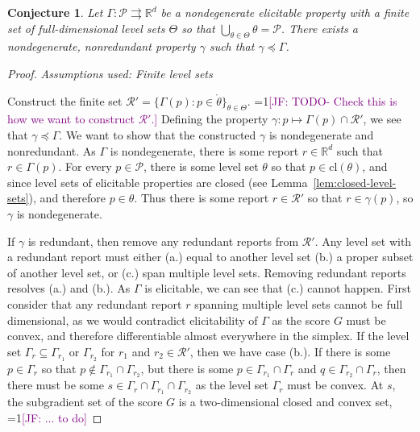 \documentclass[12pt]{article}
\newcommand{\Comments}{1}
\newcommand{\mynote}[2]{\ifnum\Comments=1\textcolor{#1}{#2}\fi}
\newcommand{\jessie}[1]{\mynote{purple}{[JF: #1]}}
\newcommand{\reals}{\mathbb{R}}
\renewcommand{\P}{\mathcal{P}}
\newcommand{\R}{\mathcal{R}}
\newcommand{\inter}[1]{\mathring{#1}}%
\newcommand{\cl}[1]{\text{cl}(#1)}
\newcommand{\toto}{\rightrightarrows}
\newcommand{\card}{\textbf{card}}
\newtheorem{conjecture}{Conjecture}
\begin{document}
\begin{conjecture}\label{conj:gam-prime-exists}
	Let $\Gamma:\P \toto \reals^d$ be a nondegenerate elicitable property with a finite set of full-dimensional level sets $\Theta$ so that $\bigcup_{\theta \in \Theta}\theta = \P$.
	There exists a nondegenerate, nonredundant property $\gamma$ such that $\gamma \preceq \Gamma$. 
\end{conjecture}
\begin{proof}
\emph{Assumptions used: Finite level sets}

	
	Construct the finite set $\R' = \{\Gamma(p) : p \in \inter{\theta} \}_{\theta \in \Theta}$. \jessie{TODO- Check this is how we want to construct $\R'$.}
	Defining the property $\gamma : p \mapsto \Gamma(p) \cap \R'$, we see that $\gamma \preceq \Gamma$.
	We want to show that the constructed $\gamma$ is nondegenerate and nonredundant.
	As $\Gamma$ is nondegenerate, there is some report $r \in \reals^d$ such that $r \in \Gamma(p)$.
	For every $p \in \P$, there is some level set $\theta$ so that $p \in \cl{\theta}$, and since level sets of elicitable properties are closed (see Lemma~\ref{lem:closed-level-sets}), and therefore $p \in \theta$.
	Thus there is some report $r \in \R'$ so that $r \in \gamma(p)$, so $\gamma$ is nondegenerate.

	If $\gamma$ is redundant, then remove any redundant reports from $\R'$.
	Any level set with a redundant report must either (a.) equal to another level set (b.) a proper subset of another level set, or (c.) span multiple level sets.
	Removing redundant reports resolves (a.) and (b.).
	As $\Gamma$ is elicitable, we can see that (c.) cannot happen.
	First consider that any redundant report $r$ spanning multiple level sets cannot be full dimensional, as we would contradict elicitability of $\Gamma$ as the score $G$ must be convex, and therefore differentiable almost everywhere in the simplex.
	If the level set $\Gamma_r \subseteq \Gamma_{r_1}$ or $\Gamma_{r_2}$ for $r_1$ and $r_2 \in \R'$, then we have case (b.).
	If there is some $p \in \Gamma_r$ so that $p \not \in \Gamma_{r_1} \cap \Gamma_{r_2}$, but there is some $p \in \Gamma_{r_1} \cap \Gamma_r$ and $q \in \Gamma_{r_2} \cap \Gamma_r$, then there must be some $s \in \Gamma_r \cap \Gamma_{r_1} \cap \Gamma_{r_2}$ as the level set $\Gamma_r$ must be convex.
	At $s$, the	subgradient set of the score $G$ is a two-dimensional closed and convex set, 
	\jessie{... to do}
	

\end{proof}
\end{document}
